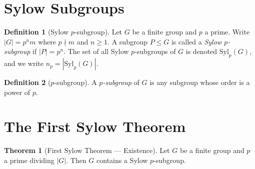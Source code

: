 \documentclass[12pt,a4paper,openany]{book}
\theoremstyle{definition}
\newtheorem{definition}{Definition}[chapter]
\newtheorem{theorem}{Theorem}[chapter]
\theoremstyle{remark}
\begin{document}
\section{Sylow Subgroups}\label{sec:sylow-subgroups}

\begin{definition}[Sylow $p$-subgroup]\label{def:sylow-subgroup}
Let $G$ be a finite group and $p$ a prime.  Write $|G|=p^n m$ where
$p\nmid m$ and $n\ge 1$.  A subgroup $P\le G$ is called a
\emph{Sylow $p$-subgroup} if $|P|=p^n$.  The set of all Sylow
$p$-subgroups of $G$ is denoted $\mathrm{Syl}_p(G)$, and we write
$n_p = |\mathrm{Syl}_p(G)|$.
\end{definition}

\begin{definition}[$p$-subgroup]\label{def:p-subgroup}
A \emph{$p$-subgroup} of $G$ is any subgroup whose order is a power of $p$.
\end{definition}

\section{The First Sylow Theorem}\label{sec:sylow-I}

\begin{theorem}[First Sylow Theorem — Existence]\label{thm:sylow-I}
Let $G$ be a finite group and $p$ a prime dividing $|G|$.  Then $G$
contains a Sylow $p$-subgroup.
\end{theorem}
\end{document}
